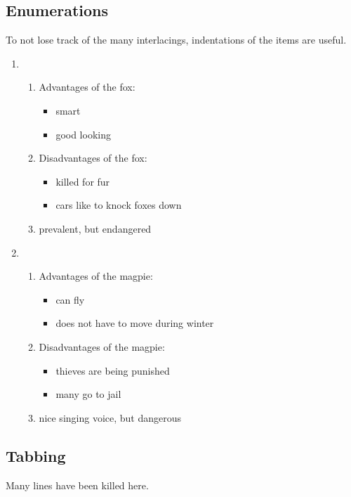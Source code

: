\documentclass[a4paper, pdftex, english, 11pt]{article}
\begin{document}
\subsection{Enumerations}
To not lose track of the many interlacings, indentations of the items are useful.
\begin{enumerate}
  \item 
  \begin{enumerate}
    \item Advantages of the fox:
    \begin{itemize}
      \item smart
      \item good looking
    \end{itemize}
    \item Disadvantages of the fox:
    \begin{itemize}
      \item killed for fur
      \item cars like to knock foxes down
    \end{itemize}
    \item prevalent, but endangered
  \end{enumerate}
  \item
  \begin{enumerate}
    \item Advantages of the magpie:
    \begin{itemize}
      \item can fly
      \item does not have to move during winter
    \end{itemize}
    \item Disadvantages of the magpie:
    \begin{itemize}
      \item thieves are being punished
      \item many go to jail
    \end{itemize}
      \item nice singing voice, but dangerous
  \end{enumerate}
\end{enumerate}

\subsection{Tabbing}

Many lines have been killed here.\\
\end{document}
